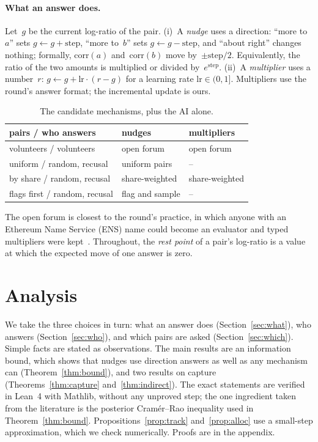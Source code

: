 \documentclass[doubleblind]{ecai}
\theoremstyle{remark}
\newcommand{\corr}{\mathrm{corr}}
\newcommand{\step}{\mathrm{step}}
\newcommand{\lr}{\mathrm{lr}}
\begin{document}
\paragraph{What an answer does.}
Let~$g$ be the current log-ratio of the pair.
(i)~A \emph{nudge} uses a direction: ``more to~$a$'' sets $g \leftarrow g + \step$, ``more to~$b$'' sets $g \leftarrow g - \step$, and ``about right'' changes nothing; formally, $\corr(a)$ and~$\corr(b)$ move by~$\pm\step/2$. Equivalently, the ratio of the two amounts is multiplied or divided by~$e^{\step}$.
(ii)~A \emph{multiplier} uses a number~$r$: $g \leftarrow g + \lr\cdot(r - g)$ for a learning rate $\lr\in(0,1]$. Multipliers use the round's answer format; the incremental update is ours.

\begin{table}[t]
\caption{The candidate mechanisms, plus the AI alone.}\label{tab:mech}
\centering\small
\begin{tabular}{@{}lll@{}}
\toprule
pairs / who answers & nudges & multipliers \\
\midrule
volunteers / volunteers & open forum & open forum \\
uniform / random, recusal & uniform pairs & -- \\
by share / random, recusal & share-weighted & share-weighted \\
flags first / random, recusal & flag and sample & -- \\
\bottomrule
\end{tabular}
\end{table}

The open forum is closest to the round's practice, in which anyone with an Ethereum Name Service (ENS) name could become an evaluator and typed multipliers were kept~\cite{gg24round}. Throughout, the \emph{rest point} of a pair's log-ratio is a value at which the expected move of one answer is zero.

\section{Analysis}\label{sec:analysis}

We take the three choices in turn: what an answer does (Section~\ref{sec:what}), who answers (Section~\ref{sec:who}), and which pairs are asked (Section~\ref{sec:which}). Simple facts are stated as observations. The main results are an information bound, which shows that nudges use direction answers as well as any mechanism can (Theorem~\ref{thm:bound}), and two results on capture (Theorems~\ref{thm:capture} and~\ref{thm:indirect}). The exact statements are verified in Lean~4 with Mathlib, without any unproved step; the one ingredient taken from the literature is the posterior Cram\'er--Rao inequality used in Theorem~\ref{thm:bound}. Propositions~\ref{prop:track} and~\ref{prop:alloc} use a small-step approximation, which we check numerically. Proofs are in the appendix.
\end{document}
